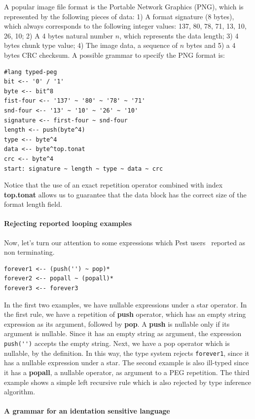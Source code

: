 \documentclass[preprint,12pt]{elsarticle}
\theoremstyle{definition}
\begin{document}
A popular image file format is the Portable Network Graphics (PNG), which
is represented by the following pieces of data: 1)
A format signature (8 bytes), which always corresponds to the
following integer values: 137, 80, 78, 71, 13, 10, 26, 10;
2) A 4 bytes natural number $n$, which represents the data length;
3) 4 bytes chunk type value;
4) The image data, a sequence of $n$ bytes and
5) a 4 bytes CRC checksum.
A possible grammar to specify the PNG format is:
\begin{verbatim}
#lang typed-peg
bit <-- '0' / '1'
byte <-- bit^8
fist-four <-- '137' ~ '80' ~ '78' ~ '71'
snd-four <-- '13' ~ '10' ~ '26' ~ '10'
signature <-- first-four ~ snd-four
length <-- push(byte^4)
type <-- byte^4
data <-- byte^top.tonat
crc <-- byte^4
start: signature ~ length ~ type ~ data ~ crc
\end{verbatim}
Notice that the use of an exact repetition operator combined with
index \textbf{top.tonat} allows us to guarantee that the data block
has the correct size of the format length field.

\paragraph{Rejecting reported looping examples} Now, let's turn our
attention to some expressions which Pest users~\cite{PESTBUG} reported as
non terminating.

\begin{verbatim}
forever1 <-- (push('') ~ pop)*
forever2 <-- popall ~ (popall)*
forever3 <-- forever3
\end{verbatim}
In the first two examples, we have nullable expressions under a star
operator. In the first rule, we have a repetition of \textbf{push} operator, which
has an empty string expression as its argument, followed by \textbf{pop}.
A \textbf{push} is nullable only if its argument is nullable. Since it
has an empty string as argument, the expression \verb|push('')|
accepts the empty string. Next, we have a pop operator which is nullable,
by the definition. In this way, the type system rejects \verb|forever1|,
since it has a nullable expression under a star. The second example is also
ill-typed since it has a \textbf{popall}, a nullable operator, as
argument to a PEG repetition.
The third example shows a simple left recursive rule
which is also rejected by type inference algorithm.

\paragraph{A grammar for an identation sensitive language}
\end{document}
